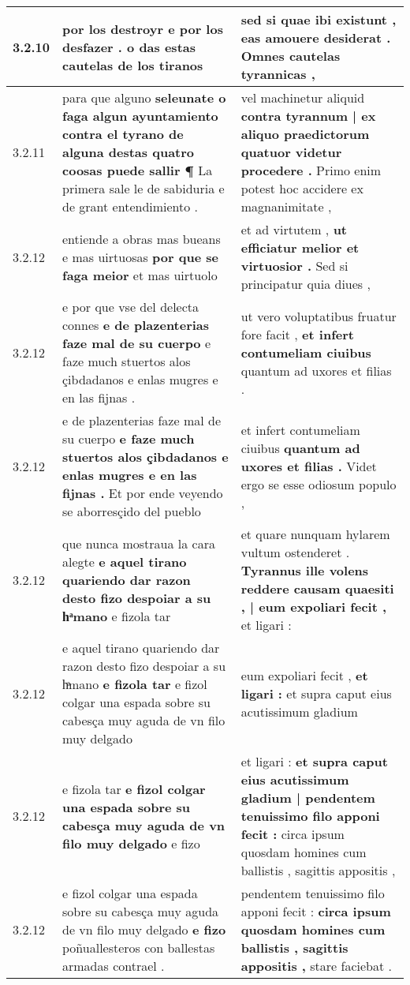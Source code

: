 \begin{tabular}{|p{1cm}|p{6.5cm}|p{6.5cm}|}
3.2.10 & por los destroyr \textbf{ e por los desfazer . } o das estas cautelas de los tiranos & sed si quae ibi existunt , \textbf{ eas amouere desiderat . } Omnes cautelas tyrannicas , \\\hline
3.2.11 & para que alguno \textbf{ seleunate o faga algun ayuntamiento contra el tyrano de alguna destas quatro coosas puede sallir ¶ } La primera sale le de sabiduria e de grant entendimiento . & vel machinetur aliquid \textbf{ contra tyrannum | ex aliquo praedictorum quatuor videtur procedere . } Primo enim potest hoc accidere ex magnanimitate , \\\hline
3.2.12 & entiende a obras mas bueans e mas uirtuosas \textbf{ por que se faga meior } et mas uirtuolo & et ad virtutem , \textbf{ ut efficiatur melior et virtuosior . } Sed si principatur quia diues , \\\hline
3.2.12 & e por que vse del delecta connes \textbf{ e de plazenterias faze mal de su cuerpo } e faze much stuertos alos çibdadanos e enlas mugres e en las fijnas . & ut vero voluptatibus fruatur fore facit , \textbf{ et infert contumeliam ciuibus } quantum ad uxores et filias . \\\hline
3.2.12 & e de plazenterias faze mal de su cuerpo \textbf{ e faze much stuertos alos çibdadanos e enlas mugres e en las fijnas . } Et por ende veyendo se aborresçido del pueblo & et infert contumeliam ciuibus \textbf{ quantum ad uxores et filias . } Videt ergo se esse odiosum populo , \\\hline
3.2.12 & que nunca mostraua la cara alegte \textbf{ e aquel tirano quariendo dar razon desto fizo despoiar a su hͣmano } e fizola tar & et quare nunquam hylarem vultum ostenderet . \textbf{ Tyrannus ille volens reddere causam quaesiti , | eum expoliari fecit , } et ligari : \\\hline
3.2.12 & e aquel tirano quariendo dar razon desto fizo despoiar a su hͣmano \textbf{ e fizola tar } e fizol colgar una espada sobre su cabesça muy aguda de vn filo muy delgado & eum expoliari fecit , \textbf{ et ligari : } et supra caput eius acutissimum gladium \\\hline
3.2.12 & e fizola tar \textbf{ e fizol colgar una espada sobre su cabesça muy aguda de vn filo muy delgado } e fizo & et ligari : \textbf{ et supra caput eius acutissimum gladium | pendentem tenuissimo filo apponi fecit : } circa ipsum quosdam homines cum ballistis , sagittis appositis , \\\hline
3.2.12 & e fizol colgar una espada sobre su cabesça muy aguda de vn filo muy delgado \textbf{ e fizo } poñuallesteros con ballestas armadas contrael . & pendentem tenuissimo filo apponi fecit : \textbf{ circa ipsum quosdam homines cum ballistis , sagittis appositis , } stare faciebat . \\\hline

\end{tabular}
